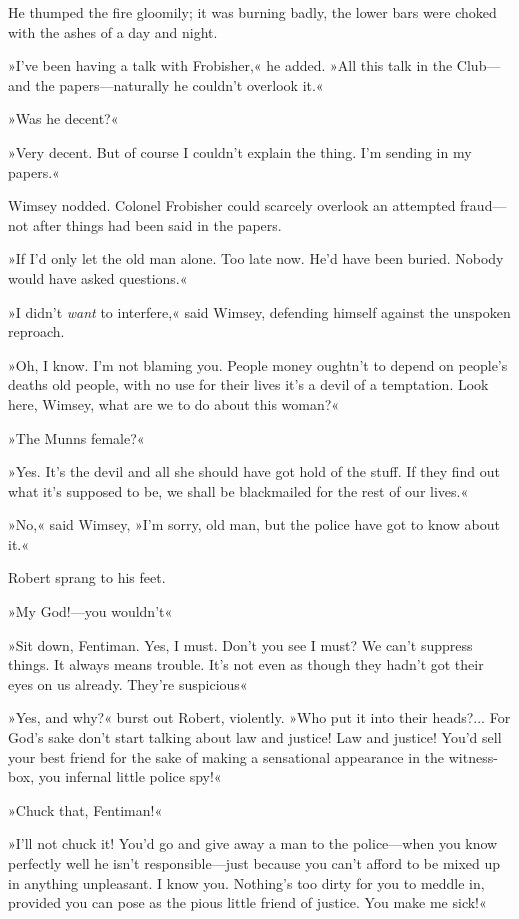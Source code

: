 He thumped the fire gloomily; it was burning badly, the lower bars were choked with the ashes of a day and night.

»I've been having a talk with Frobisher,« he added. »All this talk in the Club—and the papers—naturally he couldn't overlook it.«

»Was he decent?«

»Very decent. But of course I couldn't explain the thing. I'm sending in my papers.«

Wimsey nodded. Colonel Frobisher could scarcely overlook an attempted fraud—not after things had been said in the papers.

»If I'd only let the old man alone. Too late now. He'd have been buried. Nobody would have asked questions.«

»I didn't \textit{want} to interfere,« said Wimsey, defending himself against the unspoken reproach.

»Oh, I know. I'm not blaming you. People \textellipsis  money oughtn't to depend on people's deaths \textellipsis  old people, with no use for their lives \textellipsis  it's a devil of a temptation. Look here, Wimsey, what are we to do about this woman?«

»The Munns female?«

»Yes. It's the devil and all she should have got hold of the stuff. If they find out what it's supposed to be, we shall be blackmailed for the rest of our lives.«

»No,« said Wimsey, »I'm sorry, old man, but the police have got to know about it.«

Robert sprang to his feet.

»My God!—you wouldn't\longdash«

»Sit down, Fentiman. Yes, I must. Don't you see I must? We can't suppress things. It always means trouble. It's not even as though they hadn't got their eyes on us already. They're suspicious\longdash«

»Yes, and why?« burst out Robert, violently. »Who put it into their heads?... For God's sake don't start talking about law and justice! Law and justice! You'd sell your best friend for the sake of making a sensational appearance in the witness-box, you infernal little police spy!«

»Chuck that, Fentiman!«

»I'll not chuck it! You'd go and give away a man to the police—when you know perfectly well he isn't responsible—just because you can't afford to be mixed up in anything unpleasant. I know you. Nothing's too dirty for you to meddle in, provided you can pose as the pious little friend of justice. You make me sick!«


